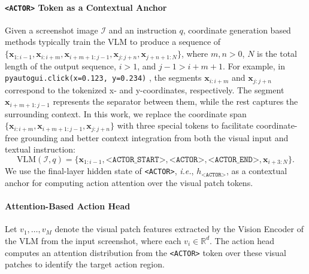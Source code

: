 \documentclass{article}
\newcommand{\kz}[1]{\textcolor{orange}{[Kanzhi: #1]}}
\newcommand{\ie}{\textit{i.e.}}
\begin{document}
\paragraph{\texttt{<ACTOR>} Token as a Contextual Anchor}
Given a screenshot image $\mathcal{I}$ and an instruction $q$, coordinate generation based methods typically train the VLM to produce a sequence of $\{\bm{x}_{1:i-1}, \bm{x}_{i:i+m}, \bm{x}_{i+m+1:j-1}, \bm{x}_{j:j+n}, \bm{x}_{j+n+1:N}\}$, where $m, n >0 $, $N$ is the total length of the output sequence, $i > 1$, and $j-1 > i+m+1$.
For example, in \texttt{pyautogui.click(x=0.123, y=0.234)} \citet{xu2024aguvis}, the segments $\bm{x}_{i:i+m}$ and $\bm{x}_{j:j+n}$ correspond to the tokenized x- and y-coordinates, respectively.
The segment $\bm{x}_{i+m+1:j-1}$ represents the separator between them, while the rest captures the surrounding context.
In this work, we replace the coordinate span $\{\bm{x}_{i:i+m}, \bm{x}_{i+m+1:j-1}, \bm{x}_{j:j+n}\}$ with three special tokens to facilitate coordinate-free grounding and better context integration from both the visual input and textual instruction:
\begin{equation}
    \text{VLM}(\mathcal{I}, q) = \{\bm{x}_{1:i-1}, \texttt{<ACTOR\_START>}, \texttt{<ACTOR>}, \texttt{<ACTOR\_END>}, \bm{x}_{i+3:N}\}.
\end{equation}
We use the final-layer hidden state of \texttt{<ACTOR>}, \ie, $h_{\texttt{<ACTOR>}}$, as a contextual anchor for computing action attention over the visual patch tokens.


\paragraph{Attention-Based Action Head}
Let ${v_1, \dots, v_M}$ denote the visual patch features extracted by the Vision Encoder of the VLM from the input screenshot, where each $v_i \in \mathbb{R}^d$. %
The action head computes an attention distribution from the \texttt{<ACTOR>} token over these visual patches to identify the target action region.
\end{document}
